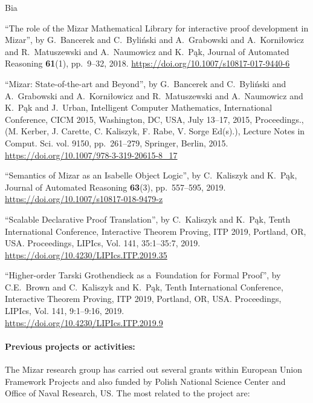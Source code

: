 \begin{sitedescription}{Bia}
\begin{compactitem}

\item ``The role of the {M}izar {M}athematical {L}ibrary for interactive proof development in {M}izar'',
by G.~Bancerek and C.~Byliński and A.~Grabowski and A.~Korniłowicz and R.~Matuszewski and A.~Naumowicz and K.~Pąk,
Journal of Automated Reasoning \textbf{61}(1), pp.~9--32, 2018.
\url{https://doi.org/10.1007/s10817-017-9440-6}

\item ``Mizar: State-of-the-art and Beyond'',
by G.~Bancerek and C.~Byliński and A.~Grabowski and A.~Korniłowicz and R.~Matuszewski and A.~Naumowicz and K.~Pąk and J.~Urban,
Intelligent Computer Mathematics, International Conference, CICM 2015, Washington, DC, USA, 
July 13--17, 2015, Proceedings., (M. Kerber, J. Carette, C. Kaliszyk, F. Rabe, V. Sorge Ed(s).), 
Lecture Notes in Comput. Sci. vol. 9150, pp.~261--279, Springer, Berlin, 2015.
\url{https://doi.org/10.1007/978-3-319-20615-8_17}

\item ``Semantics of Mizar as an Isabelle Object Logic'',
by C.~Kaliszyk and K.~Pąk,
Journal of Automated Reasoning \textbf{63}(3), pp.~557--595, 2019.
\url{https://doi.org/10.1007/s10817-018-9479-z}

\item ``Scalable Declarative Proof Translation'',
by C.~Kaliszyk and K.~Pąk,
Tenth International Conference, Interactive Theorem Proving, ITP 2019, Portland, OR, USA. 
Proceedings,  LIPIcs, Vol. 141, 35:1--35:7, 2019.
\\\url{https://doi.org/10.4230/LIPIcs.ITP.2019.35}

\item ``Higher-order Tarski Grothendieck as a~Foundation for Formal Proof'',
by C.E.~Brown and C.~Kaliszyk and K.~Pąk,
Tenth International Conference, Interactive Theorem Proving, ITP 2019, Portland, OR, USA. 
Proceedings,  LIPIcs, Vol. 141, 9:1--9:16, 2019.
\\\url{https://doi.org/10.4230/LIPIcs.ITP.2019.9}

\end{compactitem}

\paragraph{Previous projects or activities:}

The Mizar research group has carried out several grants within European Union Framework Projects 
and also funded by Polish National Science Center and Office of Naval Research, US.
The most related to the project are:


\end{sitedescription}

